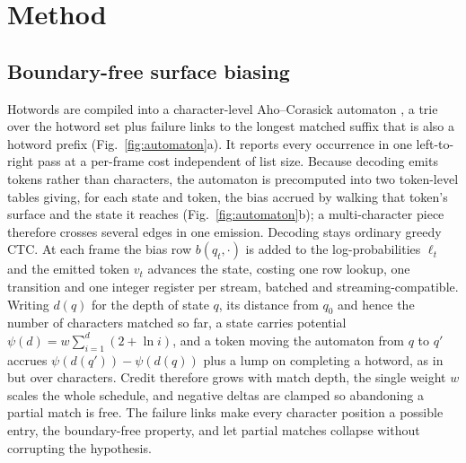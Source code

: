 \documentclass{article}
\begin{document}



\section{Method}
\label{sec:method}

\subsection{Boundary-free surface biasing}
Hotwords are compiled into a character-level Aho–Corasick automaton \cite{aho-corasick}, a trie over the hotword set plus failure links to the longest matched suffix that is also a hotword prefix (Fig.~\ref{fig:automaton}a). It reports every occurrence in one left-to-right pass at a per-frame cost independent of list size. Because decoding emits tokens rather than characters, the automaton is precomputed into two token-level tables giving, for each state and token, the bias accrued by walking that token's surface and the state it reaches (Fig.~\ref{fig:automaton}b); a multi-character piece therefore crosses several edges in one emission. Decoding stays ordinary greedy CTC. At each frame the bias row $b(q_t,\cdot)$ is added to the log-probabilities $\ell_t$ and the emitted token $v_t$ advances the state, costing one row lookup, one transition and one integer register per stream, batched and streaming-compatible. Writing $d(q)$ for the depth of state $q$, its distance from $q_0$ and hence the number of characters matched so far, a state carries potential $\psi(d)=w\sum_{i=1}^{d}(2+\ln i)$, and a token moving the automaton from $q$ to $q'$ accrues $\psi(d(q'))-\psi(d(q))$ plus a lump on completing a hotword, as in \cite{andrusenko2025turbobias} but over characters. Credit therefore grows with match depth, the single weight $w$ scales the whole schedule, and negative deltas are clamped so abandoning a partial match is free. The failure links make every character position a possible entry, the boundary-free property, and let partial matches collapse without corrupting the hypothesis.
\end{document}
